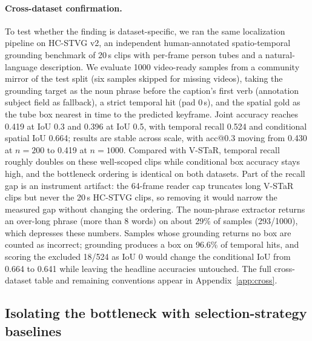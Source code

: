 \paragraph{Cross-dataset confirmation.}
To test whether the finding is dataset-specific, we ran the same localization pipeline on HC-STVG v2, an independent human-annotated spatio-temporal grounding benchmark of 20\,s clips with per-frame person tubes and a natural-language description. We evaluate 1000 video-ready samples from a community mirror of the test split (six samples skipped for missing videos), taking the grounding target as the noun phrase before the caption's first verb (annotation subject field as fallback), a strict temporal hit (pad 0\,s), and the spatial gold as the tube box nearest in time to the predicted keyframe. Joint accuracy reaches 0.419 at IoU 0.3 and 0.396 at IoU 0.5, with temporal recall 0.524 and conditional spatial IoU 0.664; results are stable across scale, with acc@0.3 moving from 0.430 at $n=200$ to 0.419 at $n=1000$. Compared with V-STaR, temporal recall roughly doubles on these well-scoped clips while conditional box accuracy stays high, and the bottleneck ordering is identical on both datasets. Part of the recall gap is an instrument artifact: the 64-frame reader cap truncates long V-STaR clips but never the 20\,s HC-STVG clips, so removing it would narrow the measured gap without changing the ordering. The noun-phrase extractor returns an over-long phrase (more than 8 words) on about 29\% of samples (293/1000), which depresses these numbers. Samples whose grounding returns no box are counted as incorrect; grounding produces a box on 96.6\% of temporal hits, and scoring the excluded 18/524 as IoU 0 would change the conditional IoU from 0.664 to 0.641 while leaving the headline accuracies untouched. The full cross-dataset table and remaining conventions appear in Appendix~\ref{app:cross}.

\subsection{Isolating the bottleneck with selection-strategy baselines}\label{sec:exp-oracle}

